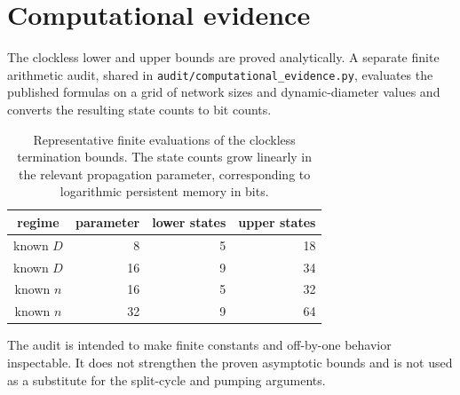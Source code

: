 \section{Computational evidence}\label{sec:computational-evidence}

The clockless lower and upper bounds are proved analytically.  A separate finite arithmetic audit, shared in \texttt{audit/computational\_evidence.py}, evaluates the published formulas on a grid of network sizes and dynamic-diameter values and converts the resulting state counts to bit counts.

\begin{table}[ht]
\centering
\begin{tabular}{c|r|r|r}
regime & parameter & lower states & upper states \\
\hline
known $D$ & 8 & 5 & 18 \\
known $D$ & 16 & 9 & 34 \\
known $n$ & 16 & 5 & 32 \\
known $n$ & 32 & 9 & 64
\end{tabular}
\caption{Representative finite evaluations of the clockless termination bounds.  The state counts grow linearly in the relevant propagation parameter, corresponding to logarithmic persistent memory in bits.}
\label{tab:clockless-finite-audit}
\end{table}

The audit is intended to make finite constants and off-by-one behavior inspectable.  It does not strengthen the proven asymptotic bounds and is not used as a substitute for the split-cycle and pumping arguments.
